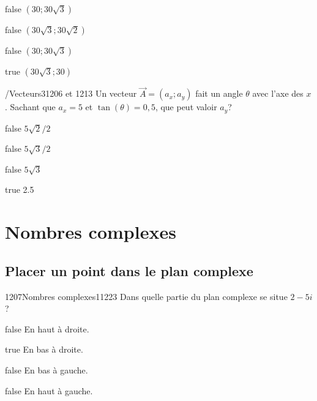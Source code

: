 \documentclass[11pt]{article}
\begin{document}
            \begin{reponses}
                \item[false] $(30; 30\sqrt{3})$
                \item[false] $(30\sqrt{3}; 30\sqrt{2})$
                \item[false] $(30; 30\sqrt{3})$
                \item[true] $(30\sqrt{3}; 30)$
            \end{reponses}
        
        	\begin{question}{/}{Vecteurs}{3}{1206 et 1213}
				Un vecteur $\vec{A}=(a_x;a_y)$ fait un angle $\theta$ avec l'axe des $x$. Sachant que $a_x=5$ et $\tan(\theta)=0,5$, que peut valoir $a_y$?
            \end{question}

            \begin{reponses}
            	\item[false] $5\sqrt{2}/2$
            	\item[false] $5\sqrt{3}/2$
                \item[false] $5\sqrt{3}$
                \item[true] 2.5
            \end{reponses}

    \section{Nombres complexes}

        \subsection{Placer un point dans le plan complexe}

            \begin{question}{1207}{Nombres complexes}{1}{1223}
                Dans quelle partie du plan complexe se situe $2-5i$?
            \end{question}

            \begin{reponses}
                \item[false] En haut à droite.
                \item[true] En bas à droite.
                \item[false] En bas à gauche.
                \item[false] En haut à gauche.
            \end{reponses}
\end{document}
